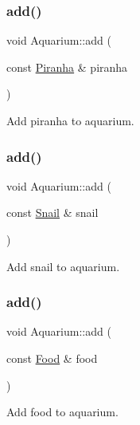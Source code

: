 \subsubsection{\texorpdfstring{add()}{add()}\hspace{0.1cm}{\footnotesize\ttfamily [2/5]}}
{\footnotesize\ttfamily void Aquarium\+::add (\begin{DoxyParamCaption}\item[{const \mbox{\hyperlink{class_piranha}{Piranha}} \&}]{piranha }\end{DoxyParamCaption})}



Add piranha to aquarium. 

\mbox{\label{class_aquarium_a9189f6891d0f9012515de3d7e4e765fe}} 
\subsubsection{\texorpdfstring{add()}{add()}\hspace{0.1cm}{\footnotesize\ttfamily [3/5]}}
{\footnotesize\ttfamily void Aquarium\+::add (\begin{DoxyParamCaption}\item[{const \mbox{\hyperlink{class_snail}{Snail}} \&}]{snail }\end{DoxyParamCaption})}



Add snail to aquarium. 

\mbox{\label{class_aquarium_a0eb7a1a387c68485088cbd7a161257cd}} 
\subsubsection{\texorpdfstring{add()}{add()}\hspace{0.1cm}{\footnotesize\ttfamily [4/5]}}
{\footnotesize\ttfamily void Aquarium\+::add (\begin{DoxyParamCaption}\item[{const \mbox{\hyperlink{class_food}{Food}} \&}]{food }\end{DoxyParamCaption})}



Add food to aquarium. 

\mbox{\label{class_aquarium_ade3137910efb46f7d47a86a1cff0716b}} 
